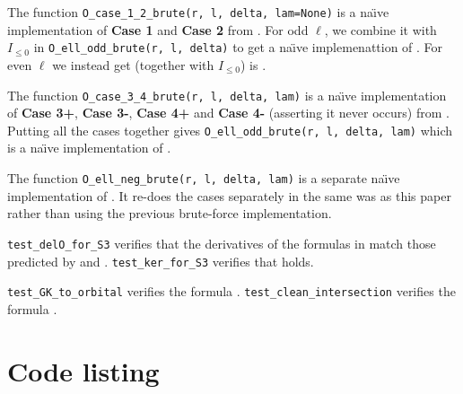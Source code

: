 \begin{enumerate}
\begin{itemize}
      \ii The function \texttt{O\_case\_1\_2\_brute(r, l, delta, lam=None)}
      is a na\"{\i}ve implementation of \textbf{Case 1} and \textbf{Case 2}
      from .
      For odd $\ell$, we combine it with $I_{\le 0}$ in \texttt{O\_ell\_odd\_brute(r, l, delta)}
      to get a na\"{\i}ve implemenattion of .
      For even $\ell$ we instead get (together with $I_{\le 0}$) is .

      \ii The function \texttt{O\_case\_3\_4\_brute(r, l, delta, lam)}
      is a na\"{\i}ve implementation of
      \textbf{Case 3\ts+}, \textbf{Case 3\ts-}, \textbf{Case 4\ts+}
      and \textbf{Case 4\ts-} (asserting it never occurs)
      from .
      Putting all the cases together gives
      \texttt{O\_ell\_odd\_brute(r, l, delta, lam)}
      which is a na\"{\i}ve implementation of .

      \ii The function \texttt{O\_ell\_neg\_brute(r, l, delta, lam)}
      is a separate na\"{\i}ve implementation of .
      It re-does the cases separately in the same was as this paper
      rather than using the previous brute-force implementation.
    \end{itemize}

  \ii \texttt{test\_delO\_for\_S3} verifies that the derivatives of the formulas in
  match those predicted by  and .
  \ii \texttt{test\_ker\_for\_S3} verifies that  holds.

  \ii \texttt{test\_GK\_to\_orbital} verifies the formula .
  \ii \texttt{test\_clean\_intersection} verifies the formula .
\end{enumerate}

\section{Code listing}

